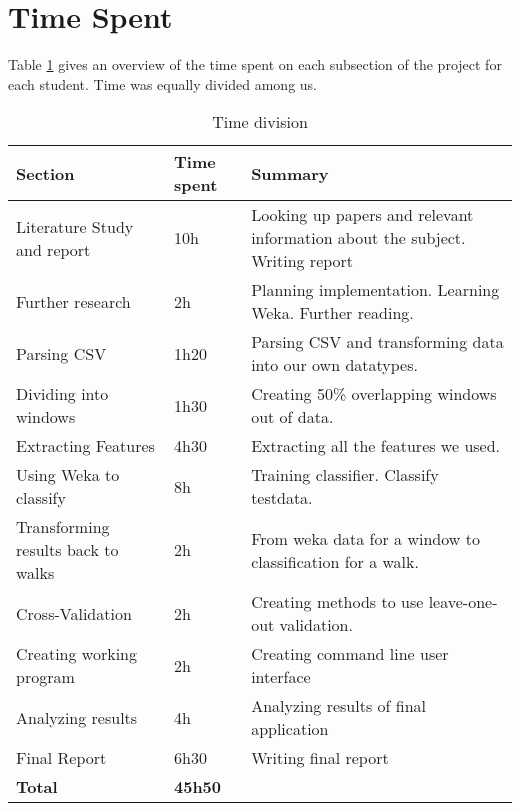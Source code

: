 \section{Time Spent}
Table \ref{time} gives an overview of the time spent on each subsection of the project for each student. Time was equally divided among us.

\begin{table}[h!]
\begin{center}
    \begin{tabular}{ | l | l |p{7cm}|}
\textbf{Section} & \textbf{Time spent} & \textbf{Summary} \\ \hline
Literature Study and report & 10h & Looking up papers and relevant information about the subject. Writing report \\ \hline
Further research & 2h & Planning implementation. Learning Weka. Further reading.\\ \hline
Parsing CSV & 1h20 & Parsing CSV and transforming data into our own datatypes.\\ \hline
Dividing into windows & 1h30 & Creating 50\% overlapping windows out of data. \\ \hline
Extracting Features & 4h30 & Extracting all the features we used.\\ \hline
Using Weka to classify & 8h & Training classifier. Classify testdata. \\ \hline
Transforming results back to walks & 2h & From weka data for a window to classification for a walk.\\ \hline
Cross-Validation & 2h & Creating methods to use leave-one-out validation.\\ \hline
Creating working program & 2h & Creating command line user interface \\ \hline
Analyzing results & 4h & Analyzing results of final application \\ \hline
Final Report & 6h30 & Writing final report \\ \hline
\textbf{Total} & \textbf{45h50} \\ \hline
    

\end{tabular}
\end{center}
\caption{Time division}\label{time}
\end{table}


